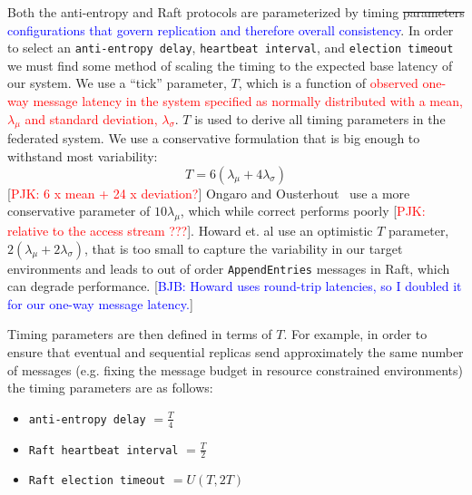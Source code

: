 \documentclass[10pt,conference,letterpaper]{IEEEtran}
\newcommand{\todo}[1]{{\textcolor{red}{#1}}}
\newcommand{\blue}[1]{{\textcolor{blue}{#1}}}
\newcommand{\pjk}[1]{[\todo{PJK: #1}]}
\newcommand{\bjb}[1]{[\blue{BJB: #1}]}
\newcommand{\red}[1]{\textcolor{red}{#1}}
\begin{document}
Both the anti-entropy and Raft protocols are parameterized by timing \st{parameters} \blue{configurations that govern replication and therefore overall consistency}.
In order to select an \texttt{anti-entropy delay}, \texttt{heartbeat
interval}, and \texttt{election timeout} we must find some method of
scaling the timing to the expected base latency of our system.
We use a ``tick'' parameter, $T$, which is a function of
\red{observed one-way message latency in the system specified as normally
distributed with a mean, $\lambda_{\mu}$ and standard deviation,
$\lambda_{\sigma}$}.
$T$ is used to derive all timing parameters in the federated system.
We use a conservative formulation that is
big enough to withstand most variability:
\begin{equation}
    T = 6(\lambda_{\mu} + 4\lambda_{\sigma})
\end{equation}
\pjk{6 x mean + 24 x deviation?}
Ongaro and Ousterhout~\cite{ongaro_search_2014} use a more conservative
parameter of $10\lambda_{\mu}$, which while correct performs poorly \pjk{relative to the
access stream ???}.
Howard et.
al \cite{howard_raft_2015} use an
optimistic $T$ parameter, $2\left(\lambda_{\mu} + 2\lambda_{\sigma}\right)$, that is too small to capture
the variability in our target environments and leads to out of order
\texttt{AppendEntries} messages in Raft, which can degrade performance. \bjb{Howard uses round-trip latencies, so I doubled it for our one-way message latency.}

Timing parameters are then defined in terms of $T$.
For example, in order to ensure that eventual and sequential replicas send approximately
the same number of messages (e.g.
fixing the message budget in resource constrained environments) the timing
parameters are as follows:
\begin{itemize}
    \item \texttt{anti-entropy delay} $= \frac{T}{4}$
    \item \texttt{Raft heartbeat interval} $= \frac{T}{2}$
    \item \texttt{Raft election timeout} $= U(T, 2T)$
\end{itemize}

\end{document}
